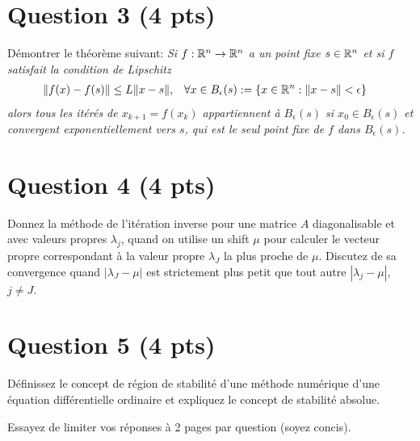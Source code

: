 \section*{Question 3 (4 pts)}
Démontrer le théorème suivant:
\textit{
  Si $f: \mathbb{R}^n \to \mathbb{R}^n$ a un point fixe $s \in \mathbb{R}^n$ et si $f$ satisfait
  la condition de Lipschitz
  \begin{align*}
    \|f(x) - f(s)\| & \leq L\|x-s\|, &
    \forall x \in B_\epsilon(s) & := \{x \in \mathbb{R}^n : \|x - s\| < \epsilon\}
  \end{align*}
  alors tous les itérés de $x_{k+1} = f(x_k)$ appartiennent à $B_\epsilon(s)$
  si $x_0 \in B_\epsilon(s)$ et convergent exponentiellement vers $s$,
  qui est le seul point fixe de $f$ dans $B_\epsilon(s)$.
}

\begin{solution}
\end{solution}

\section*{Question 4 (4 pts)}
Donnez la méthode de l'itération inverse pour une matrice $A$
diagonalisable et avec valeurs propres $\lambda_j$,
quand on utilise un shift $\mu$ pour calculer le vecteur propre
correspondant à la valeur propre $\lambda_J$ la plus proche de $\mu$.
Discutez de sa convergence quand $|\lambda_J - \mu|$ est
strictement plus petit que tout autre $|\lambda_j - \mu|$, $j \neq J$.

\begin{solution}
\end{solution}

\section*{Question 5 (4 pts)}
Définissez le concept de région de stabilité d'une méthode numérique
d'une équation différentielle ordinaire et expliquez le concept de
stabilité absolue.

\begin{solution}
\end{solution}

Essayez de limiter vos réponses à 2 pages par question (soyez concis).



